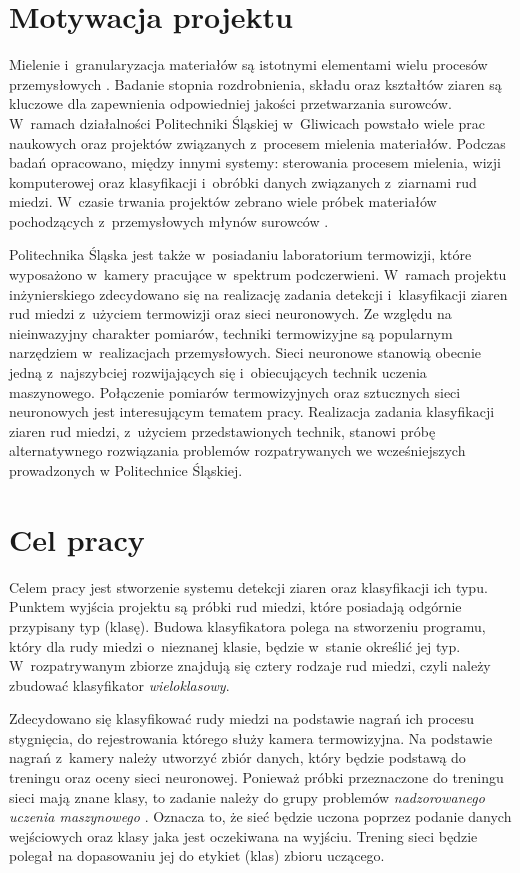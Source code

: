 \section{Motywacja projektu}
Mielenie i~granularyzacja materiałów są istotnymi elementami wielu procesów
przemysłowych \cite{budzan_grains}.
Badanie stopnia rozdrobnienia, składu oraz kształtów ziaren są kluczowe dla
zapewnienia odpowiedniej jakości przetwarzania surowców.
W~ramach działalności Politechniki Śląskiej w~Gliwicach powstało wiele prac
naukowych oraz projektów związanych z~procesem mielenia materiałów.
Podczas badań opracowano, między innymi systemy: sterowania procesem mielenia,
wizji komputerowej oraz klasyfikacji i~obróbki danych związanych z~ziarnami rud
miedzi.
W~czasie trwania projektów zebrano wiele próbek materiałów pochodzących
z~przemysłowych młynów surowców \cite{budzan_grains, krauze_milling}.

Politechnika Śląska jest także w~posiadaniu laboratorium termowizji, które
wyposażono w~kamery pracujące w~spektrum podczerwieni.
W~ramach projektu inżynierskiego zdecydowano się na realizację zadania detekcji
i~klasyfikacji ziaren rud miedzi z~użyciem termowizji oraz sieci neuronowych.
Ze względu na nieinwazyjny charakter pomiarów, techniki termowizyjne są
popularnym narzędziem w~realizacjach przemysłowych.
Sieci neuronowe stanowią obecnie jedną z~najszybciej rozwijających się
i~obiecujących technik uczenia maszynowego.
Połączenie pomiarów termowizyjnych oraz sztucznych sieci neuronowych jest
interesującym tematem pracy.
Realizacja zadania klasyfikacji ziaren rud miedzi, z~użyciem przedstawionych
technik, stanowi próbę alternatywnego rozwiązania problemów rozpatrywanych we
wcześniejszych prowadzonych w Politechnice Śląskiej.

\section{Cel pracy}
Celem pracy jest stworzenie systemu detekcji ziaren oraz klasyfikacji ich typu.
Punktem wyjścia projektu są próbki rud miedzi, które posiadają odgórnie
przypisany typ (klasę).
Budowa klasyfikatora polega na stworzeniu programu, który dla rudy miedzi
o~nieznanej klasie, będzie w~stanie określić jej typ.
W~rozpatrywanym zbiorze znajdują się cztery rodzaje rud miedzi, czyli należy
zbudować klasyfikator \emph{wieloklasowy}.

Zdecydowano się klasyfikować rudy miedzi na podstawie nagrań ich procesu
stygnięcia, do rejestrowania którego służy kamera termowizyjna.
Na podstawie nagrań z~kamery należy utworzyć zbiór danych, który będzie podstawą
do treningu oraz oceny sieci neuronowej.
Ponieważ próbki przeznaczone do treningu sieci mają znane klasy, to zadanie
należy do grupy problemów \emph{nadzorowanego uczenia maszynowego}
\cite[str.~108]{chollet_dl}.
Oznacza to, że sieć będzie uczona poprzez podanie danych wejściowych oraz klasy
jaka jest oczekiwana na wyjściu.
Trening sieci będzie polegał na dopasowaniu jej do etykiet (klas) zbioru
uczącego.

